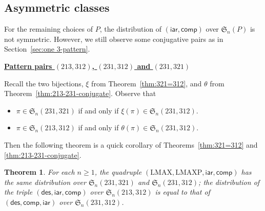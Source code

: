 \documentclass[12pt]{amsart}
\numberwithin{equation}{section}
\theoremstyle{plain}
\newtheorem{theorem}{Theorem}[section]
\theoremstyle{definition}
\def\des{\mathsf{des}}
\def\S{\mathfrak{S}}
\def\iar{\mathsf{iar}}
\def\comp{\mathsf{comp}}
\def\LMAX{\mathrm{LMAX}}
\def\LMAXP{\mathrm{LMAXP}}
\begin{document}
\subsection{Asymmetric classes}
For the remaining choices of $P$, the distribution of $(\iar,\comp)$ over $\S_n(P)$ is not symmetric. However, we still observe some conjugative pairs as in Section~\ref{sec:one 3-pattern}.

\medskip
\noindent \underline{\bf Pattern pairs $(213,312)$, $(231,312)$ and $(231,321)$}
\medskip

Recall the two bijections, $\xi$ from Theorem~\ref{thm:321=312}, and $\theta$ from Theorem~\ref{thm:213-231-conjugate}. Observe that
\begin{itemize}
	\item $\pi\in\S_n(231,321)$ if and only if $\xi(\pi)\in\S_n(231,312)$.
	\item $\pi\in\S_n(213,312)$ if and only if $\theta(\pi)\in\S_n(231,312)$.
\end{itemize}
Then the following theorem is a quick corollary of Theorems~\ref{thm:321=312} and \ref{thm:213-231-conjugate}.

\begin{theorem}\label{thm:triple-two-3}
For each $n\ge 1$, the quadruple $(\LMAX,\LMAXP,\iar,\comp)$ has the same distribution over $\S_n(231,321)$ and $\S_n(231,312)$; the distribution of the triple $(\des,\iar,\comp)$ over $\S_n(213,312)$ is equal to that of $(\des,\comp,\iar)$ over $\S_n(231,312)$.
\end{theorem}
\end{document}
